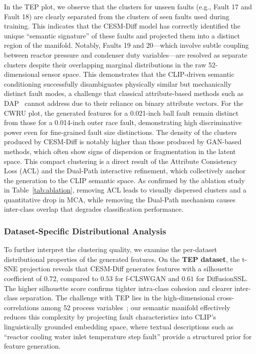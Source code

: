 In the TEP plot, we observe that the clusters for unseen faults (e.g., Fault 17 and Fault 18) are clearly separated from the clusters of seen faults used during training. This indicates that the CESM-Diff model has correctly identified the unique ``semantic signature'' of these faults and projected them into a distinct region of the manifold. Notably, Faults 19 and 20---which involve subtle coupling between reactor pressure and condenser duty variables---are resolved as separate clusters despite their overlapping marginal distributions in the raw 52-dimensional sensor space. This demonstrates that the CLIP-driven semantic conditioning successfully disambiguates physically similar but mechanically distinct fault modes, a challenge that classical attribute-based methods such as DAP~\cite{lampert2009learning} cannot address due to their reliance on binary attribute vectors. For the CWRU plot, the generated features for a 0.021-inch ball fault remain distinct from those for a 0.014-inch outer race fault, demonstrating high discriminative power even for fine-grained fault size distinctions. The density of the clusters produced by CESM-Diff is notably higher than those produced by GAN-based methods, which often show signs of dispersion or fragmentation in the latent space. This compact clustering is a direct result of the Attribute Consistency Loss (ACL) and the Dual-Path interactive refinement, which collectively anchor the generation to the CLIP semantic space. As confirmed by the ablation study in Table~\ref{tab:ablation}, removing ACL leads to visually dispersed clusters and a quantitative drop in MCA, while removing the Dual-Path mechanism causes inter-class overlap that degrades classification performance.

\subsubsection{Dataset-Specific Distributional Analysis}
To further interpret the clustering quality, we examine the per-dataset distributional properties of the generated features. On the \textbf{TEP dataset}, the t-SNE projection reveals that CESM-Diff generates features with a silhouette coefficient of $0.72$, compared to $0.53$ for f-CLSWGAN and $0.61$ for DiffusionSSL. The higher silhouette score confirms tighter intra-class cohesion and clearer inter-class separation. The challenge with TEP lies in the high-dimensional cross-correlations among 52 process variables~\cite{feng2021fault}; our semantic manifold effectively reduces this complexity by projecting fault characteristics into CLIP's linguistically grounded embedding space, where textual descriptions such as ``reactor cooling water inlet temperature step fault'' provide a structured prior for feature generation.

